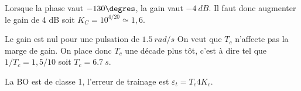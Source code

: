 \ifprof
Lorsque la phase vaut $-130\degres$, la gain vaut $-\SI{4}{dB}$. Il faut donc augmenter le gain de 4 dB soit $K_C = 10^{4/20} \simeq 1,6$. 
%
%


\else 
\fi

\ifprof
Le gain est nul pour une pulsation de $\SI{1,5}{rad/s}$ On veut que $T_c$ n'affecte pas la marge de gain. On place donc $T_c$ une décade plus tôt, c'est à dire tel que $1/T_c = 1,5/10$ soit $T_c = \SI{6,7}{s}.$ 
\else 
\fi


\ifprof
La BO est de classe 1, l'erreur de trainage est $\varepsilon_t = {T_c}{4K_c}$.
\else 
\fi


\ifprof
\else




\fi

